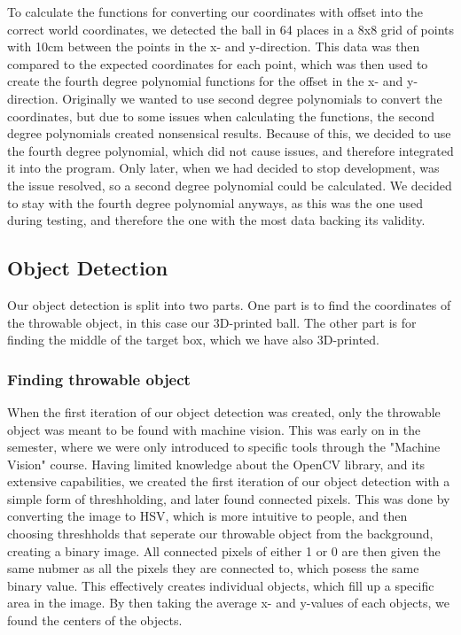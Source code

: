 To calculate the functions for converting our coordinates with offset into the correct world coordinates, we detected the ball in 64 places in a 8x8 grid of points with 10cm between the points in the x- and y-direction.
This data was then compared to the expected coordinates for each point, which was then used to create the fourth degree polynomial functions for the offset in the x- and y-direction. 
Originally we wanted to use second degree polynomials to convert the coordinates, but due to some issues when calculating the functions, the second degree polynomials created nonsensical results. 
Because of this, we decided to use the fourth degree polynomial, which did not cause issues, and therefore integrated it into the program.
Only later, when we had decided to stop development, was the issue resolved, so a second degree polynomial could be calculated.
We decided to stay with the fourth degree polynomial anyways, as this was the one used during testing, and therefore the one with the most data backing its validity.


\subsection{Object Detection}
Our object detection is split into two parts.
One part is to find the coordinates of the throwable object, in this case our 3D-printed ball.
The other part is for finding the middle of the target box, which we have also 3D-printed.

\subsubsection{Finding throwable object}
When the first iteration of our object detection was created, only the throwable object was meant to be found with machine vision. 
This was early on in the semester, where we were only introduced to specific tools through the "Machine Vision" course.
Having limited knowledge about the OpenCV library, and its extensive capabilities, we created the first iteration of our object detection with a simple form of threshholding, and later found connected pixels.
This was done by converting the image to HSV, which is more intuitive to people, and then choosing threshholds that seperate our throwable object from the background, creating a binary image.
All connected pixels of either 1 or 0 are then given the same nubmer as all the pixels they are connected to, which posess the same binary value.
This effectively creates individual objects, which fill up a specific area in the image. 
By then taking the average x- and y-values of each objects, we found the centers of the objects.

